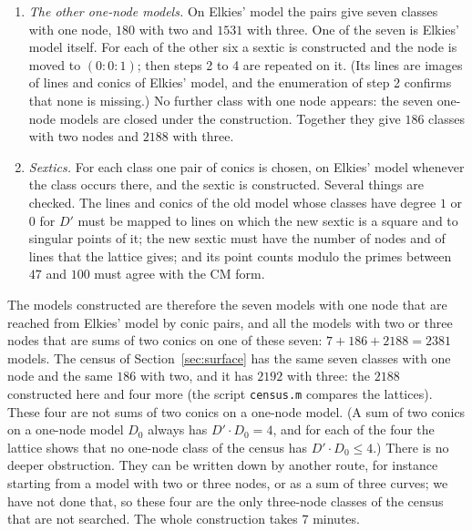 \documentclass[11pt]{article}
\theoremstyle{remark}
\begin{document}
\begin{enumerate}
\item \emph{The other one-node models.}  On Elkies' model the pairs give seven classes with one node, $180$ with two and $1531$
with three.  One of the seven is Elkies' model itself.  For each of the other six a sextic is constructed and the node is moved to
$(0:0:1)$; then steps 2 to 4 are repeated on it.  (Its lines are images of lines and conics of Elkies' model, and the enumeration of
step 2 confirms that none is missing.)  No further class with one node appears:
the seven one-node models are closed under the construction.  Together they give $186$ classes with two nodes and $2188$ with
three.
\item \emph{Sextics.}  For each class one pair of conics is chosen, on Elkies' model whenever the class occurs there, and the
sextic is constructed.  Several things are checked.  The lines and conics of the old model whose classes have degree $1$ or $0$
for $D'$ must be mapped to lines on which the new sextic is a square and to singular points of it; the new sextic must have the number
of nodes and of lines that the lattice gives; and its point counts modulo the primes between $47$ and $100$ must agree with the CM form.
\end{enumerate}
The models constructed are therefore the seven models with one node that are reached from Elkies' model by conic pairs, and all the
models with two or three nodes that are sums of two conics on one of these seven: $7+186+2188=2381$ models.  The census of
Section~\ref{sec:surface} has the same seven classes with one node and the same $186$ with two, and it has $2192$ with three: the
$2188$ constructed here and four more (the script \texttt{census.m} compares the lattices).  These four are not sums of two conics on a one-node model.  (A sum of two conics on a
one-node model $D_0$ always has $D'\cdot D_0=4$, and for each of the four the lattice shows that no one-node class of the census
has $D'\cdot D_0\le 4$.)  There is no deeper obstruction.  They can be written down by another route, for instance starting from a
model with two or three nodes, or as a sum of three curves; we have not done that, so these four are the only three-node classes
of the census that are not searched.  The whole construction takes $7$ minutes.
\end{document}
